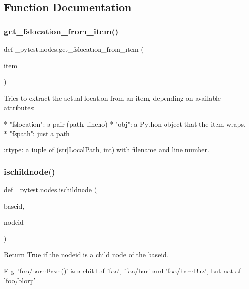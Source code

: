 \subsection{Function Documentation}
\mbox{\label{namespace__pytest_1_1nodes_ac6dc8c7424d5ce289282190c7b58fbe5}} 
\subsubsection{\texorpdfstring{get\+\_\+fslocation\+\_\+from\+\_\+item()}{get\_fslocation\_from\_item()}}
{\footnotesize\ttfamily def \+\_\+pytest.\+nodes.\+get\+\_\+fslocation\+\_\+from\+\_\+item (\begin{DoxyParamCaption}\item[{}]{item }\end{DoxyParamCaption})}

\begin{DoxyVerb}Tries to extract the actual location from an item, depending on available attributes:

* "fslocation": a pair (path, lineno)
* "obj": a Python object that the item wraps.
* "fspath": just a path

:rtype: a tuple of (str|LocalPath, int) with filename and line number.
\end{DoxyVerb}
 \mbox{\label{namespace__pytest_1_1nodes_a2501f3fe735e1e64eab91f16214d7b0e}} 
\subsubsection{\texorpdfstring{ischildnode()}{ischildnode()}}
{\footnotesize\ttfamily def \+\_\+pytest.\+nodes.\+ischildnode (\begin{DoxyParamCaption}\item[{}]{baseid,  }\item[{}]{nodeid }\end{DoxyParamCaption})}

\begin{DoxyVerb}Return True if the nodeid is a child node of the baseid.

E.g. 'foo/bar::Baz::()' is a child of 'foo', 'foo/bar' and 'foo/bar::Baz', but not of 'foo/blorp'
\end{DoxyVerb}
 

